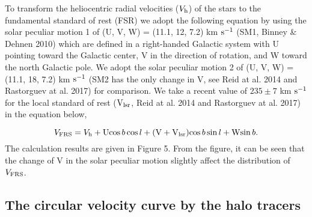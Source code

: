 \documentclass[12pt,preprint]{aastex}
\begin{document}
To transform the heliocentric radial velocities ($V_{\rm h}$) of
the stars to the fundamental standard of rest (FSR) we
adopt the following equation by using the solar peculiar motion 1 of (U, V, W) =
(11.1, 12, 7.2) km ${\rm s}^{-1}$ (SM1, Binney \& Dehnen 2010) which are defined in a right-handed Galactic system with U
pointing toward the Galactic center, V in the direction of rotation,
and W toward the north Galactic pole. We adopt the solar peculiar motion 2 of (U, V, W) =
(11.1, 18, 7.2) km ${\rm s}^{-1}$ (SM2 has the only change in V, see Reid at al. 2014 and Rastorguev at al. 2017) for comparison.  We take a recent value of $235\pm7$ km ${\rm s}^{-1}$ for the local standard of rest ($\rm{V}_{\rm lsr}$, Reid at al. 2014 and Rastorguev at al. 2017) in the equation below,

\begin{equation}
V_{\rm FRS} = V_{\rm h} + {\rm U} {\rm cos}\, b\, {\rm cos}\, l + ({\rm V} + {\rm V}_{\rm lsr})
{\rm cos}\, b\, {\rm sin}\, l + {\rm W} {\rm sin}\, b.
\end{equation}
The calculation results are given in Figure 5. From the figure, it can be seen that the change of V in the solar peculiar motion slightly affect the distribution of $V_{\rm FRS}$.





\subsection{\textbf{The circular velocity curve} by the halo tracers}
\end{document}
